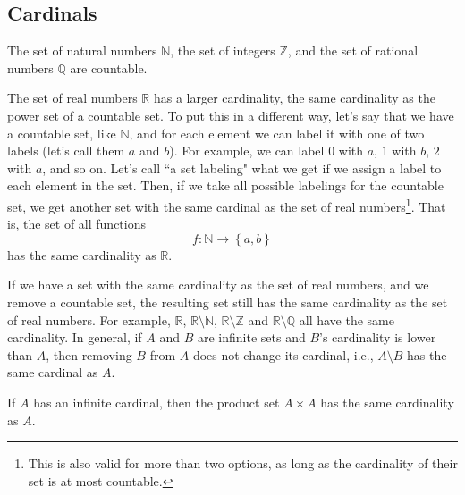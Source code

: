 \documentclass[a4paper
,draft
]{article}
\def\reale{\mathbb{R}}
\def\intregi{\mathbb{Z}}
\def\naturale{\mathbb{N}}
\def\rationale{\mathbb{Q}}
\newcommand{\multime}[1]{\left\{ #1 \right\}}
\newcommand{\ghilimele}[1]{``#1"}
\begin{document}
\subsection{Cardinals}
\label{sec:cardinals}

The set of natural numbers $\naturale$, the set of integers $\intregi$, and
the set of rational numbers $\rationale$ are countable.

The set of real numbers $\reale$ has a larger cardinality, the same cardinality
as the power set of a countable set. To put this in a different way, let's say
that we have a countable set, like $\naturale$,
and for each element we can label it with one of two
labels (let's call them $a$ and $b$).
For example, we can label $0$ with $a$, $1$ with $b$, $2$ with $a$, and so on.
Let's call \ghilimele{a set labeling} what we get if we assign a
label to each element in the set.
Then, if we take all possible labelings for the countable set,
we get another set with the same cardinal as the set of real numbers\footnote{
    This is also valid for more than two options, as long as the cardinality
    of their set is at most countable.
  }.
That is, the set of all functions
$$
f : \naturale \longrightarrow \multime{a, b}
$$
has the same cardinality as $\reale$.

If we have a set with the same cardinality as the set of real numbers, and
we remove a countable set, the resulting set still has the same cardinality
as the set of real numbers. For example, $\reale$, $\reale\setminus\naturale$,
$\reale\setminus\intregi$ and $\reale\setminus\rationale$ all have the same
cardinality. In general, if $A$ and $B$ are infinite sets and
$B$'s cardinality is lower than $A$, then removing $B$ from $A$ does not change
its cardinal, i.e., $A\setminus B$ has the same cardinal as $A$.

If $A$ has an infinite cardinal, then the product set $A\times A$ has the same
cardinality as $A$.

\printbibliography
\end{document}
